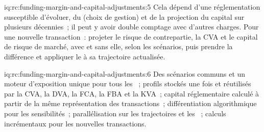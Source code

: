 \begin{solution}{iq:rc:funding-margin-and-capital-adjustments:5}
Cela dépend d'une réglementation susceptible d'évoluer, du  (choix de gestion) et de la
projection du capital sur plusieurs décennies~; il peut y avoir double comptage avec d'autres charges. Pour une nouvelle
transaction~: projeter le risque de contrepartie, la CVA et le capital de risque de marché, avec et sans elle, selon les scénarios, puis
prendre la différence et appliquer le  à sa trajectoire actualisée.
\end{solution}

\begin{solution}{iq:rc:funding-margin-and-capital-adjustments:6}
Des scénarios communs et un moteur d'exposition unique pour tous les ~; profils stockés une fois et réutilisés par
la CVA, la DVA, la FCA, la FBA et la KVA~; capital réglementaire calculé à partir de la même représentation des transactions~;
différentiation algorithmique pour les sensibilités~; parallélisation sur les trajectoires et les ~; calculs
incrémentaux pour les nouvelles transactions.
\end{solution}
